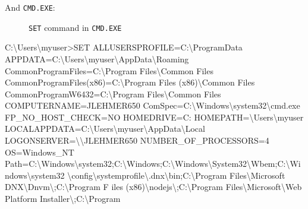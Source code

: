 \documentclass[10pt,american,]{book}
\newenvironment{Shaded}{\begin{snugshade}}{\end{snugshade}}
\newcommand{\KeywordTok}[1]{\textcolor[rgb]{0.13,0.29,0.53}{\textbf{{#1}}}}
\newcommand{\DataTypeTok}[1]{\textcolor[rgb]{0.13,0.29,0.53}{{#1}}}
\newcommand{\OtherTok}[1]{\textcolor[rgb]{0.56,0.35,0.01}{{#1}}}
\newcommand{\NormalTok}[1]{{#1}}
\numberwithin{figure}{chapter}
\DeclareRobustCommand{\drcap}[1]{\begin{figure}[H]\caption{#1}\end{figure}}
\renewcommand{\KeywordTok}[1]{{#1}}
\renewcommand{\DataTypeTok}[1]{{#1}}
\renewcommand{\OtherTok}[1]{{#1}}
\renewcommand{\NormalTok}[1]{{#1}}
\begin{document}
And \texttt{CMD.EXE}:

\drcap{\texttt{SET} command in \texttt{CMD.EXE}}

\begin{Shaded}
\begin{Highlighting}[]
\KeywordTok{C}\NormalTok{:\textbackslash{}Users\textbackslash{}myuser}\KeywordTok{>}\NormalTok{SET}
\OtherTok{ALLUSERSPROFILE=}\NormalTok{C:\textbackslash{}}\KeywordTok{ProgramData}
\OtherTok{APPDATA=}\NormalTok{C:\textbackslash{}}\KeywordTok{Users}\NormalTok{\textbackslash{}myuser\textbackslash{}AppData\textbackslash{}Roaming}
\OtherTok{CommonProgramFiles=}\NormalTok{C:\textbackslash{}}\KeywordTok{Program} \NormalTok{Files\textbackslash{}Common Files}
\KeywordTok{CommonProgramFiles}\NormalTok{(x86)=}\KeywordTok{C}\NormalTok{:\textbackslash{}Program Files (x86)\textbackslash{}}\KeywordTok{Common} \NormalTok{Files}
\OtherTok{CommonProgramW6432=}\NormalTok{C:\textbackslash{}}\KeywordTok{Program} \NormalTok{Files\textbackslash{}Common Files}
\OtherTok{COMPUTERNAME=}\NormalTok{JLEHMER650}
\OtherTok{ComSpec=}\NormalTok{C:\textbackslash{}}\KeywordTok{Windows}\NormalTok{\textbackslash{}system32\textbackslash{}cmd.exe}
\OtherTok{FP_NO_HOST_CHECK=}\NormalTok{NO}
\OtherTok{HOMEDRIVE=}\NormalTok{C:}
\OtherTok{HOMEPATH=}\NormalTok{\textbackslash{}}\KeywordTok{Users}\NormalTok{\textbackslash{}myuser}
\OtherTok{LOCALAPPDATA=}\NormalTok{C:\textbackslash{}}\KeywordTok{Users}\NormalTok{\textbackslash{}myuser\textbackslash{}AppData\textbackslash{}Local}
\OtherTok{LOGONSERVER=}\DataTypeTok{\textbackslash{}\textbackslash{}}\NormalTok{JLEHMER650}
\OtherTok{NUMBER_OF_PROCESSORS=}\NormalTok{4}
\OtherTok{OS=}\NormalTok{Windows_NT}
\OtherTok{Path=}\NormalTok{C:\textbackslash{}}\KeywordTok{Windows}\NormalTok{\textbackslash{}system32}\KeywordTok{;C}\NormalTok{:\textbackslash{}Windows}\KeywordTok{;C}\NormalTok{:\textbackslash{}Windows\textbackslash{}System32\textbackslash{}Wbem}\KeywordTok{;C}\NormalTok{:\textbackslash{}Windows\textbackslash{}system32}
\NormalTok{\textbackslash{}}\KeywordTok{config}\NormalTok{\textbackslash{}systemprofile\textbackslash{}.dnx\textbackslash{}bin}\KeywordTok{;C}\NormalTok{:\textbackslash{}Program Files\textbackslash{}Microsoft DNX\textbackslash{}Dnvm}\DataTypeTok{\textbackslash{};}\NormalTok{C:\textbackslash{}Program F}
\KeywordTok{iles} \NormalTok{(x86)\textbackslash{}}\KeywordTok{nodejs}\DataTypeTok{\textbackslash{};}\NormalTok{C:\textbackslash{}Program Files\textbackslash{}Microsoft\textbackslash{}Web Platform Installer}\DataTypeTok{\textbackslash{};}\NormalTok{C:\textbackslash{}Program}

\end{Highlighting}
\end{Shaded}
\end{document}
